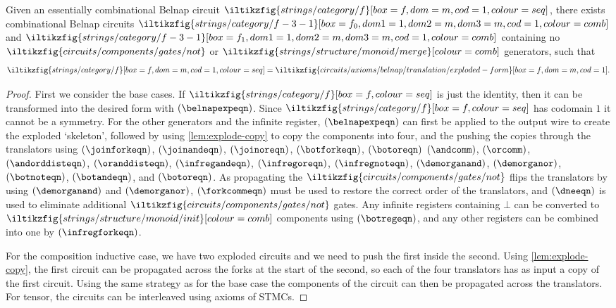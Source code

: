 \begin{proposition}\label{prop:exploded-belnap}
    Given an essentially combinational Belnap circuit \(
    \iltikzfig{strings/category/f}[box=f,dom=m,cod=1,colour=seq]
    \), there exists combinational Belnap circuits \(
    \iltikzfig{strings/category/f-3-1}[box=f_0,dom1=1,dom2=m,dom3=m,cod=1,colour=comb]
    \) and \(
    \iltikzfig{strings/category/f-3-1}[box=f_1,dom1=1,dom2=m,dom3=m,cod=1,colour=comb]
    \) containing no \(
    \iltikzfig{circuits/components/gates/not}
    \) or \(
    \iltikzfig{strings/structure/monoid/merge}[colour=comb]
    \) generators, such that \[
        \iltikzfig{strings/category/f}[box=f,dom=m,cod=1,colour=seq]
        =
        \iltikzfig{circuits/axioms/belnap/translation/exploded-form}[box=f,dom=m,cod=1].
    \]
\end{proposition}
\begin{proof}
    First we consider the base cases.
    If \(
    \iltikzfig{strings/category/f}[box=f,colour=seq]
    \) is just the identity, then it can be transformed into the desired form
    with
    \((\belnapexpeqn)\).
    Since \(\iltikzfig{strings/category/f}[box=f,colour=seq]\) has codomain
    \(1\) it cannot be a symmetry.
    For the other generators and the infinite register,
    \((\belnapexpeqn)\) can first be applied to the output wire to create the
    exploded `skeleton', followed by using \cref{lem:explode-copy} to copy the
    components into four, and the pushing the copies through the translators
    using \((\joinforkeqn)\), \((\joinandeqn)\), \((\joinoreqn)\),
    \((\botforkeqn)\), \((\botoreqn)\) \((\andcomm)\), \((\orcomm)\),
    \((\andorddisteqn)\), \((\oranddisteqn)\), \((\infregandeqn)\),
    \((\infregoreqn)\), \((\infregnoteqn)\), \((\demorganand)\),
    \((\demorganor)\), \((\botnoteqn)\), \((\botandeqn)\), and \((\botoreqn)\).
    As propagating the \(
    \iltikzfig{circuits/components/gates/not}
    \) flips the translators by using \((\demorganand)\) and \((\demorganor)\),
    \((\forkcommeqn)\) must be used to restore the correct order of the
    translators, and \((\dneeqn)\) is used to eliminate additional
    \(\iltikzfig{circuits/components/gates/not}\) gates.
    Any infinite registers containing \(\bot\) can be converted to
    \(\iltikzfig{strings/structure/monoid/init}[colour=comb]\) components using
    \((\botregeqn)\), and any other registers can be combined into one by
    \((\infregforkeqn)\).

    For the composition inductive case, we have two exploded circuits and we
    need to push the first inside the second.
    Using \cref{lem:explode-copy}, the first circuit can be propagated across
    the forks at the start of the second, so each of the four translators has as
    input a copy of the first circuit.
    Using the same strategy as for the base case the components of the circuit
    can then be propagated across the translators.
    For tensor, the circuits can be interleaved using axioms of STMCs.
\end{proof}

